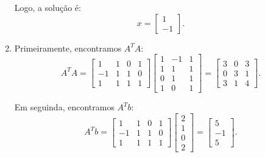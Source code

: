 \begin{resolution}
\begin{enumerate}[label=\alph*)]
          Logo, a solução é:
          \[
            x = \begin{bmatrix}
              1 \\
              -1
            \end{bmatrix}.
          \]

    \item  Primeiramente, encontramos \( A^T A \):
          \[
            A^T A = \begin{bmatrix}
              1  & 1 & 0 & 1 \\
              -1 & 1 & 1 & 0 \\
              1  & 1 & 1 & 1
            \end{bmatrix}
            \begin{bmatrix}
              1 & -1 & 1 \\
              1 & 1  & 1 \\
              0 & 1  & 1 \\
              1 & 0  & 1
            \end{bmatrix} =
            \begin{bmatrix}
              3 & 0 & 3 \\
              0 & 3 & 1 \\
              3 & 1 & 4
            \end{bmatrix}.
          \]

          Em seguinda, encontramos \( A^T b \):
          \[
            A^T b = \begin{bmatrix}
              1  & 1 & 0 & 1 \\
              -1 & 1 & 1 & 0 \\
              1  & 1 & 1 & 1
            \end{bmatrix}
            \begin{bmatrix}
              2 \\
              1 \\
              0 \\
              2
            \end{bmatrix} =
            \begin{bmatrix}
              5  \\
              -1 \\
              5
            \end{bmatrix}.
          \]


\end{enumerate}
\end{resolution}
